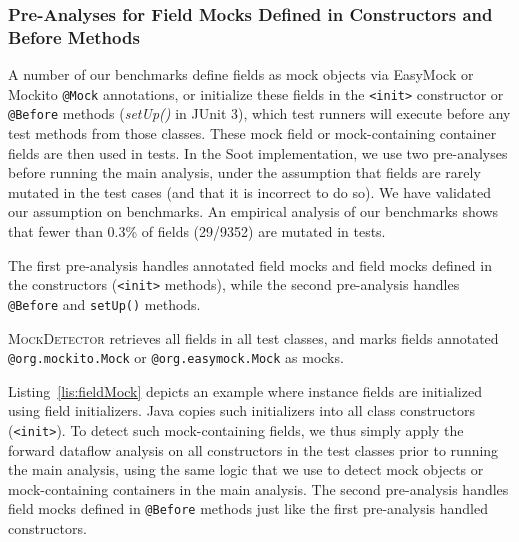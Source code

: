 \subsubsection{Pre-Analyses for Field Mocks Defined in Constructors and Before Methods}
\label{subsubsec:pre-analysis} 
A number of our benchmarks define fields as mock objects via EasyMock or Mockito \texttt{@Mock} annotations, or initialize these fields in the \texttt{<init>} constructor or \texttt{@Before} methods (\textit{setUp()} in JUnit 3), which test runners will execute before any test methods from those classes. These mock field or mock-containing container fields are then used in tests. In the Soot implementation, we use two pre-analyses before running the main analysis, under the assumption that fields are rarely mutated in the test cases (and that it is incorrect to do so). We have validated our assumption on benchmarks. An empirical analysis of our benchmarks shows that fewer than 0.3\% of fields (29/9352) are mutated in tests.

The first pre-analysis handles annotated field mocks and field mocks defined in the constructors (\texttt{<init>} methods), while the second pre-analysis handles \texttt{@Before} and \texttt{setUp()} methods. 

\textsc{MockDetector} retrieves all fields in all test classes, and marks fields annotated {\tt @org.mockito.Mock} or {\tt @org.easymock.Mock} as mocks.

Listing~\ref{lis:fieldMock} depicts an example where instance fields are initialized using field initializers. Java copies such initializers into all class constructors (\texttt{<init>}). To detect such mock-containing fields, we thus simply apply the forward dataflow analysis on all constructors in the test classes prior to running the main analysis, using the same logic that we use to detect mock objects or mock-containing containers in the main analysis. The second pre-analysis handles field mocks defined in \texttt{@Before} methods just like the first pre-analysis handled constructors.



